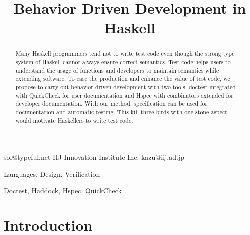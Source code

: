 \documentclass[preprint]{sigplanconf}
\begin{document}
\copyrightdata{[to be supplied]}


\title{Behavior Driven Development in Haskell}

           {}
           {sol@typeful.net}
           {IIJ Innovation Institute Inc.}
           {kazu@iij.ad.jp}

\maketitle

\begin{abstract}

Many Haskell programmers tend not to write test code even though the
strong type system of Haskell cannot always ensure correct semantics.
Test code helps users to understand the usage of
functions and developers to maintain semantics
while extending software. To ease the production and enhance the value of test code, we
propose to carry out behavior driven development with two tools:
doctest integrated with QuickCheck for user documentation and Hspec
with combinators extended for developer documentation. With our
method, specification can be used for documentation and automatic
testing. This kill-three-birds-with-one-stone aspect would motivate
Haskellers to write test code.


\end{abstract}


\terms Languages, Design, Verification

\keywords Doctest, Haddock, Hspec, QuickCheck

\section{Introduction}

\end{document}
